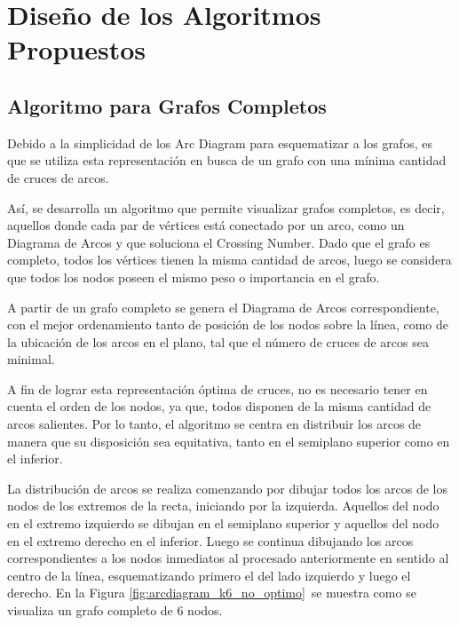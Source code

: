 \chapter{Diseño de los Algoritmos Propuestos}\label{cap3}

\section{Algoritmo para Grafos Completos}
\label{sec:diseno_algoritmo_completo}
	Debido  a la  simplicidad de los Arc Diagram para esquematizar a los  grafos,  es que se  utiliza esta representación en busca de un grafo con una mínima cantidad de cruces de arcos.
	
	Así, se desarrolla  un algoritmo que permite visualizar  grafos  completos, es decir, aquellos donde cada par de vértices está conectado por un arco, como un Diagrama de Arcos y que  soluciona el Crossing Number.
    Dado que el  grafo es completo, todos  los vértices tienen la misma cantidad de arcos,  luego se considera que todos los nodos poseen el mismo peso o importancia en el grafo. %

	
	
	A partir de un grafo completo se  genera  el  Diagrama de Arcos correspondiente, con  el mejor ordenamiento tanto de posición de los nodos sobre la línea, como de la ubicación de los arcos en el  plano,  tal que el número de cruces de arcos sea minimal.
	
	A fin de lograr esta representación óptima de cruces, no es necesario tener en cuenta el orden de los nodos, ya que, todos disponen de la misma cantidad de arcos salientes. Por lo tanto, el algoritmo se centra en distribuir los arcos de manera que su disposición sea equitativa, tanto en el semiplano  superior como en el inferior.
	
	La distribución de arcos se realiza comenzando por  dibujar  todos los arcos de los nodos de los extremos de la  recta, iniciando por la izquierda. Aquellos del nodo en el extremo  izquierdo  se dibujan en el semiplano  superior y aquellos del  nodo en el extremo  derecho en el inferior. Luego se continua dibujando los arcos correspondientes a los  nodos inmediatos al  procesado anteriormente en sentido al  centro de la línea, esquematizando primero el del lado izquierdo y luego el derecho. En la Figura \ref{fig:arcdiagram_k6_no_optimo}\ se muestra como  se visualiza  un grafo completo de 6 nodos.
	
